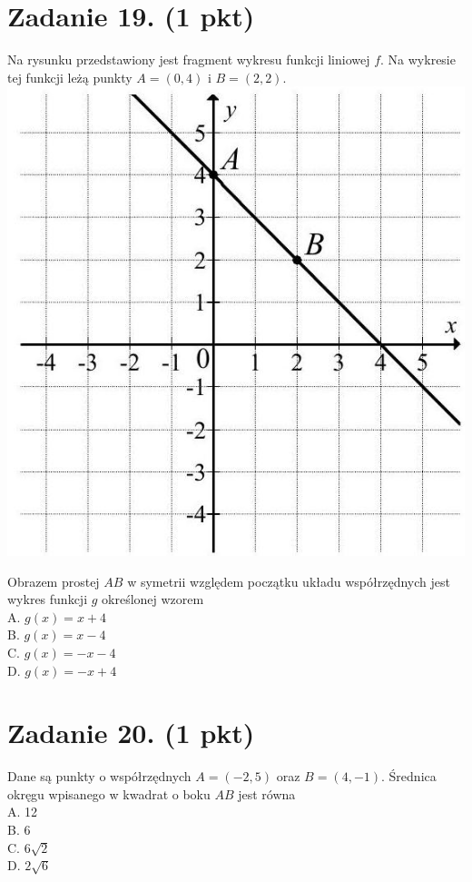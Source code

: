 \documentclass[10pt]{article}
\begin{document}
\section*{Zadanie 19. (1 pkt)}
Na rysunku przedstawiony jest fragment wykresu funkcji liniowej \(f\). Na wykresie tej funkcji leżą punkty \(A=(0,4)\) i \(B=(2,2)\).\\
\includegraphics[max width=\textwidth, center]{2024_11_21_d51d653f4fe4a5bb0c33g-10}

Obrazem prostej \(A B\) w symetrii względem początku układu współrzędnych jest wykres funkcji \(g\) określonej wzorem\\
A. \(g(x)=x+4\)\\
B. \(g(x)=x-4\)\\
C. \(g(x)=-x-4\)\\
D. \(g(x)=-x+4\)

\section*{Zadanie 20. (1 pkt)}
Dane są punkty o współrzędnych \(A=(-2,5)\) oraz \(B=(4,-1)\). Średnica okręgu wpisanego w kwadrat o boku \(A B\) jest równa\\
A. 12\\
B. 6\\
C. \(6 \sqrt{2}\)\\
D. \(2 \sqrt{6}\)
\end{document}

